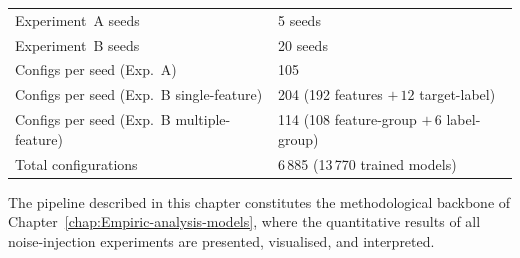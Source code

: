 \documentclass[../main.tex]{subfiles}
\begin{document}
\begin{table}[H]
\begin{tabular}{ll}
Experiment~A seeds                & 5 seeds \\
Experiment~B seeds                & 20 seeds \\
Configs per seed (Exp.~A)         & 105 \\
Configs per seed (Exp.~B single-feature) & 204 (192 features $+\,12$ target-label) \\
Configs per seed (Exp.~B multiple-feature) & 114 (108 feature-group $+\,6$ label-group) \\
Total configurations              & 6\,885 (13\,770 trained models) \\
\bottomrule
\end{tabular}
\end{table}

The pipeline described in this chapter constitutes the methodological backbone of Chapter~\ref{chap:Empiric-analysis-models}, where the quantitative results of all noise-injection experiments are presented, visualised, and interpreted.
\end{document}
